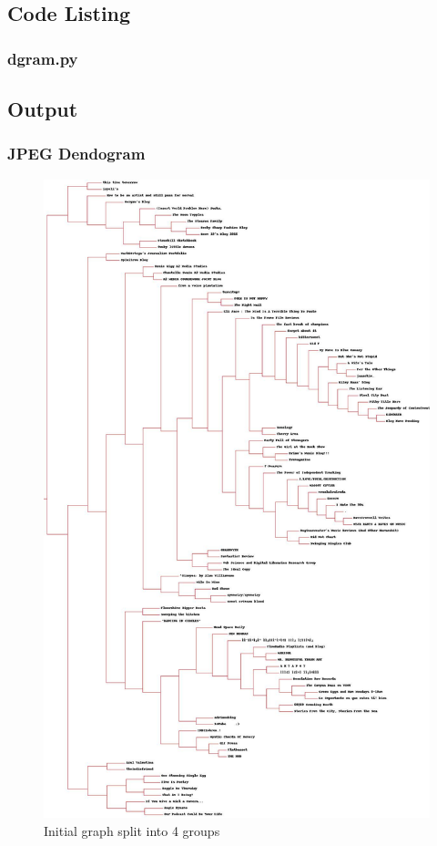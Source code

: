 \documentclass[12pt]{article}
\begin{document}
\subsection{Code Listing}
\subsubsection{dgram.py}

\newpage

\subsection{Output}

\subsubsection{JPEG Dendogram}
\begin{figure}[ht]
\includegraphics[scale=0.2]{../../q2/dendogram.jpg}
\centering
\caption{Initial graph split into 4 groups}
\label{Initial graph split into 4 groups}
\end{figure}
\newpage
\end{document}
